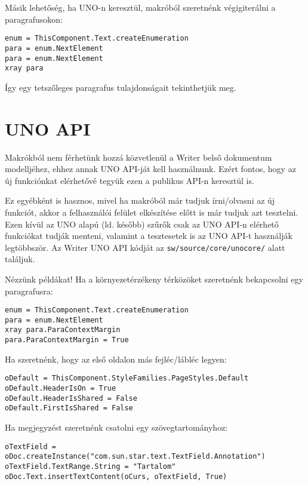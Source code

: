 \documentclass[a4paper]{report}
\begin{document}
Másik lehetőség, ha UNO-n keresztül, makróból szeretnénk végigiterálni a paragrafusokon:

\begin{verbatim}
enum = ThisComponent.Text.createEnumeration
para = enum.NextElement
para = enum.NextElement
xray para
\end{verbatim}

Így egy tetszőleges paragrafus tulajdonságait tekinthetjük meg.

\section{UNO API}

Makrókból nem férhetünk hozzá közvetlenül a Writer belső dokumentum
modelljéhez, ehhez annak UNO API-ját kell használnunk. Ezért fontos, hogy az új
funkciónkat elérhetővé tegyük ezen a publikus API-n keresztül is.

Ez egyébként is hasznos, mivel ha makróból már tudjuk írni/olvasni az új
funkciót, akkor a felhasználói felület elkészítése előtt is már tudjuk azt
tesztelni. Ezen kívül az UNO alapú (ld. később) szűrők csak az UNO API-n
elérhető funkciókat tudják menteni, valamint a tesztesetek is az UNO API-t
használják legtöbbször. Az Writer UNO API kódját az
\texttt{sw/source/core/unocore/} alatt találjuk.

Nézzünk példákat! Ha a környezetérzékeny térközöket szeretnénk bekapcsolni egy paragrafusra:

\begin{verbatim}
enum = ThisComponent.Text.createEnumeration
para = enum.NextElement
xray para.ParaContextMargin
para.ParaContextMargin = True
\end{verbatim}

Ha szeretnénk, hogy az első oldalon más fejléc/lábléc legyen:

\begin{verbatim}
oDefault = ThisComponent.StyleFamilies.PageStyles.Default
oDefault.HeaderIsOn = True
oDefault.HeaderIsShared = False
oDefault.FirstIsShared = False
\end{verbatim}

Ha megjegyzést szeretnénk csatolni egy szövegtartományhoz:

\begin{verbatim}
oTextField =
oDoc.createInstance("com.sun.star.text.TextField.Annotation")
oTextField.TextRange.String = "Tartalom"
oDoc.Text.insertTextContent(oCurs, oTextField, True)
\end{verbatim}
\end{document}
